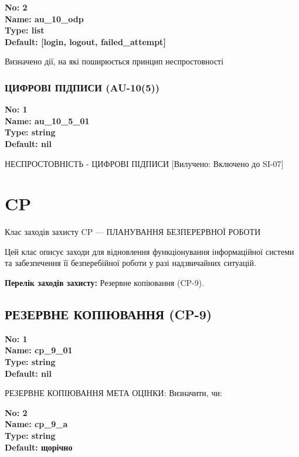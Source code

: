\documentclass{article}
\begin{document}
{\footnotesize\bfseries
No: 2\\
Name: au\_\allowbreak{}10\_\allowbreak{}odp\\
Type: list\\
Default: [\textquotedbl{}login\textquotedbl{}, \textquotedbl{}logout\textquotedbl{}, \textquotedbl{}failed\_\allowbreak{}attempt\textquotedbl{}]
}

{\footnotesize Визначено дії, на які поширюється принцип неспростовності}




\subsubsection{ЦИФРОВІ ПІДПИСИ (AU-10(5))}


\vspace{10pt}
{\footnotesize\bfseries
No: 1\\
Name: au\_\allowbreak{}10\_\allowbreak{}5\_\allowbreak{}01\\
Type: string\\
Default: nil
}

{\footnotesize НЕСПРОСТОВНІСТЬ - ЦИФРОВІ ПІДПИСИ [Вилучено: Включено до SI-07]}




\section{CP}
Клас заходів захисту CP --- ПЛАНУВАННЯ БЕЗПЕРЕРВНОЇ РОБОТИ

Цей клас описує заходи для відновлення функціонування інформаційної системи та забезпечення її безперебійної роботи у разі надзвичайних ситуацій.

\textbf{Перелік заходів захисту:} Резервне копіювання (CP-9).

\subsection{РЕЗЕРВНЕ КОПІЮВАННЯ (CP-9)}


\vspace{10pt}
{\footnotesize\bfseries
No: 1\\
Name: cp\_\allowbreak{}9\_\allowbreak{}01\\
Type: string\\
Default: nil
}

{\footnotesize РЕЗЕРВНЕ КОПІЮВАННЯ МЕТА ОЦІНКИ: Визначити, чи:}


{\footnotesize\bfseries
No: 2\\
Name: cp\_\allowbreak{}9\_\allowbreak{}a\\
Type: string\\
Default: \textquotedbl{}щорічно\textquotedbl{}
}
\end{document}

